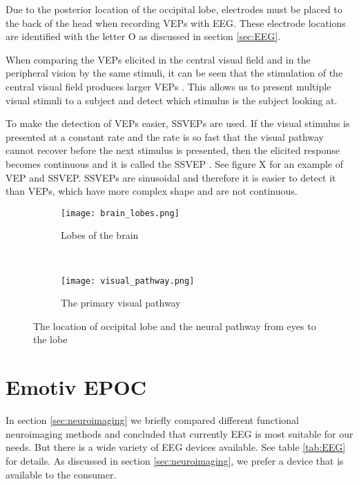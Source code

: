 Due to the posterior location of the occipital lobe, electrodes must be placed to the back of the head when recording \glspl{VEP} with \gls{EEG}. These electrode locations are identified with the letter O as discussed in section \ref{sec:EEG}.

When comparing the \glspl{VEP} elicited in the central visual field and in the peripheral vision by the same stimuli, it can be seen that the stimulation of the central visual field produces larger \glspl{VEP} \cite{VEP_size}. This allows us to present multiple visual stimuli to a subject and detect which stimulus is the subject looking at. 

To make the detection of \glspl{VEP} easier, \glspl{SSVEP} are used. If the visual stimulus is presented at a constant rate and the rate is so fast that the visual pathway cannot recover before the next stimulus is presented, then the elicited response becomes continuous and it is called the \gls{SSVEP} \cite{VEP}. See figure X for an example of \gls{VEP} and \gls{SSVEP}. \glspl{SSVEP} are sinusoidal and therefore it is easier to detect it than \glspl{VEP}, which have more complex shape and are not continuous.

\begin{figure}[h]
	\centering
	\begin{subfigure}{0.48\textwidth}
		\texttt{[image: brain\_lobes.png]}
		\caption{Lobes of the brain \cite{blausen}}
		\label{fig:brain_lobes}
	\end{subfigure}
	~
	\begin{subfigure}{0.48\textwidth}
		\texttt{[image: visual\_pathway.png]}
		\caption{The primary visual pathway \cite[p.~261]{neuroscience}}
		\label{fig:visual_pathway}
	\end{subfigure}
	\caption{The location of occipital lobe and the neural pathway from eyes to the lobe}
	\label{fig:lobes_pathway}
\end{figure}

\section{Emotiv EPOC}

In section \ref{sec:neuroimaging} we briefly compared different functional neuroimaging methods and concluded that currently \gls{EEG} is most suitable for our needs. But there is a wide variety of EEG devices available. See table \ref{tab:EEG} for details. As discussed in section \ref{sec:neuroimaging}, we prefer a device that is available to the consumer.

